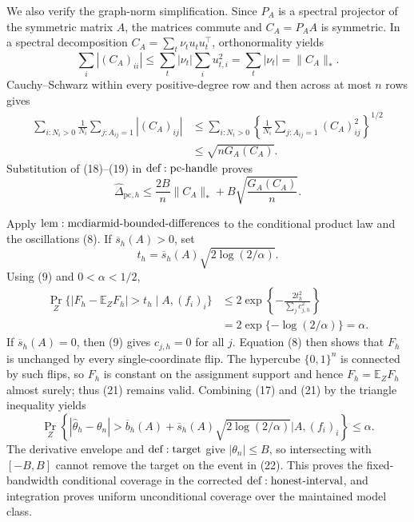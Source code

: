 We also verify the graph-norm simplification.  Since \(P_A\) is a spectral projector of the symmetric matrix \(A\), the matrices commute and \(C_A=P_AA\) is symmetric.  In a spectral decomposition \(C_A=\sum_t\nu_tu_tu_t^\top\), orthonormality yields
\[
 \sum_i|(C_A)_{ii}|
 \leq\sum_t|\nu_t|\sum_i u_{t,i}^2
 =\sum_t|\nu_t|=\|C_A\|_*.
\tag{18}
\]
Cauchy--Schwarz within every positive-degree row and then across at most \(n\) rows gives
\[
\begin{aligned}
 \sum_{i:N_i>0}\frac1{N_i}\sum_{j:A_{ij}=1}|(C_A)_{ij}|
 &\leq\sum_{i:N_i>0}
 \left\{\frac1{N_i}\sum_{j:A_{ij}=1}(C_A)_{ij}^2\right\}^{1/2}\\
 &\leq\sqrt{nG_A(C_A)}.
\end{aligned}
\tag{19}
\]
Substitution of (18)--(19) in \({\rm def:pc\text{-}handle}\) proves
\[
 \widehat\Delta_{\mathrm{pc},h}
 \leq\frac{2B}{n}\|C_A\|_*+B\sqrt{\frac{G_A(C_A)}n}.
\tag{20}
\]

Apply \({\rm lem:mcdiarmid\text{-}bounded\text{-}differences}\) to the conditional product law and the oscillations (8).  If \(\overline s_h(A)>0\), set
\[
 t_h=\overline s_h(A)\sqrt{2\log(2/\alpha)}.
\]
Using (9) and \(0<\alpha<1/2\),
\[
\begin{aligned}
 \Pr_Z\{|F_h-\mathbb E_ZF_h|>t_h\mid A,(f_i)_i\}
 &\leq2\exp\left\{-\frac{2t_h^2}{\sum_jc_{j,h}^2}\right\}\\
 &=2\exp\{-\log(2/\alpha)\}=\alpha.
\end{aligned}
\tag{21}
\]
If \(\overline s_h(A)=0\), then (9) gives \(c_{j,h}=0\) for all \(j\).  Equation (8) then shows that \(F_h\) is unchanged by every single-coordinate flip.  The hypercube \(\{0,1\}^n\) is connected by such flips, so \(F_h\) is constant on the assignment support and hence \(F_h=\mathbb E_ZF_h\) almost surely; thus (21) remains valid.  Combining (17) and (21) by the triangle inequality yields
\[
 \Pr_Z\!\left\{
 |\widehat\theta_h-\theta_n|>
 \overline b_h(A)+\overline s_h(A)\sqrt{2\log(2/\alpha)}
 \mathrel{\Big|}A,(f_i)_i\right\}\leq\alpha.
\tag{22}
\]
The derivative envelope and \({\rm def:target}\) give \(|\theta_n|\leq B\), so intersecting with \([-B,B]\) cannot remove the target on the event in (22).  This proves the fixed-bandwidth conditional coverage in the corrected \({\rm def:honest\text{-}interval}\), and integration proves uniform unconditional coverage over the maintained model class.

